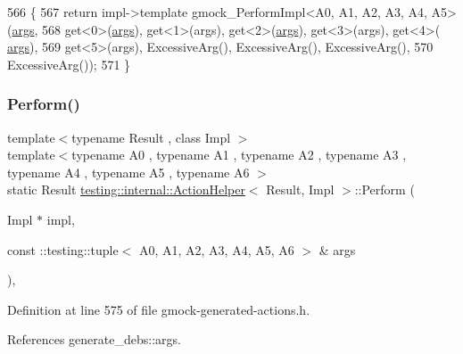 \begin{DoxyCode}
566                  \{
567     \textcolor{keywordflow}{return} impl->template gmock\_PerformImpl<A0, A1, A2, A3, A4, A5>(\hyperlink{namespacegenerate__debs_a75f9143e38df82d83b2e8a6f99cae02c}{args},
568         get<0>(\hyperlink{namespacegenerate__debs_a75f9143e38df82d83b2e8a6f99cae02c}{args}), get<1>(args), get<2>(\hyperlink{namespacegenerate__debs_a75f9143e38df82d83b2e8a6f99cae02c}{args}), get<3>(args), get<4>(
      \hyperlink{namespacegenerate__debs_a75f9143e38df82d83b2e8a6f99cae02c}{args}),
569         get<5>(args), ExcessiveArg(), ExcessiveArg(), ExcessiveArg(),
570         ExcessiveArg());
571   \}
\end{DoxyCode}
\mbox{\label{classtesting_1_1internal_1_1ActionHelper_a457f1505b200c5125c3bb370fb7e7bb4}} 
\subsubsection{\texorpdfstring{Perform()}{Perform()}\hspace{0.1cm}{\footnotesize\ttfamily [8/11]}}
{\footnotesize\ttfamily template$<$typename Result , class Impl $>$ \\
template$<$typename A0 , typename A1 , typename A2 , typename A3 , typename A4 , typename A5 , typename A6 $>$ \\
static Result \hyperlink{classtesting_1_1internal_1_1ActionHelper}{testing\+::internal\+::\+Action\+Helper}$<$ Result, Impl $>$\+::Perform (\begin{DoxyParamCaption}\item[{Impl $\ast$}]{impl,  }\item[{const \+::testing\+::tuple$<$ A0, A1, A2, A3, A4, A5, A6 $>$ \&}]{args }\end{DoxyParamCaption})\hspace{0.3cm}{\ttfamily [inline]}, {\ttfamily [static]}}



Definition at line 575 of file gmock-\/generated-\/actions.\+h.



References generate\+\_\+debs\+::args.


